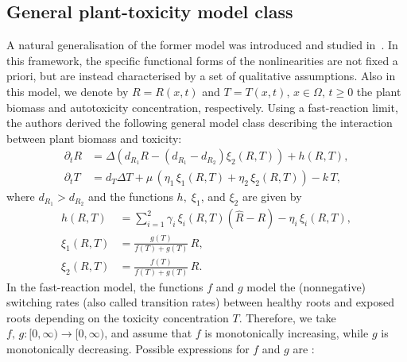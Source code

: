 \documentclass[a4paper,10pt,abstract=true,parskip=true]{scrartcl}
\theoremstyle{remark}
\numberwithin{equation}{section}
\numberwithin{thm}{section}
\begin{document}
\subsection{General plant-toxicity model class}\label{sec:model_class}
A natural generalisation of the former model was introduced and studied in~\cite{Morgan_etal.2025}. In this framework, the specific functional forms of the nonlinearities are not fixed a priori, but are instead characterised by a set of qualitative assumptions. Also in this model, we denote by $R=R(x,t)$ and $T=T(x,t), \, x\in \Omega, \, t\geq 0$ the plant biomass and autotoxicity concentration, respectively. Using a fast-reaction limit, the authors derived the following general model class describing the interaction between plant biomass and toxicity:
\begin{subequations}\label{eq:model_class}
    \begin{align}
    \partial_t R &= \Delta \left(d_{R_1}R - (d_{R_1}-d_{R_2}) \xi_2(R,T)\right) + h(R,T),\\
    \partial_t T &= d_T \Delta T + \mu\,\left(\eta_1\,\xi_1(R,T) + \eta_2\,\xi_2(R,T)\right) - k\,T,
    \end{align}
\end{subequations}
where $d_{R_1}>d_{R_2}$ and the functions $h, \; \xi_1$, and $\xi_2$ are given by
\begin{subequations}\label{eq:model_class_nonlinearities}
    \begin{align}
        h(R,T) &= \sum_{i=1}^2 \gamma_i\,\xi_i(R,T) \left(\hat{R}-R\right) - \eta_i\,\xi_i(R,T),\\
        \xi_1(R,T) &= \frac{g(T)}{f(T)+g(T)}\,R,\\
        \xi_2(R,T) &= \frac{f(T)}{f(T)+g(T)}\,R.
    \end{align}
\end{subequations}
In the fast-reaction model, the functions $f$ and $g$ model the (nonnegative) switching rates (also called transition rates) between healthy roots and exposed roots depending on the toxicity concentration $T$. Therefore, we take $f,\, g : [0,\infty) \to [0,\infty)$, and assume that $f$ is monotonically increasing, while $g$ is monotonically decreasing. Possible expressions for $f$ and $g$ are \cite{Morgan_etal.2025}:
\end{document}
